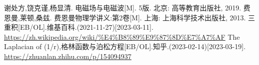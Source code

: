 \begin{thebibliography}{99}%
     谢处方,饶克谨,杨显清. 电磁场与电磁波[M]. 5版. 北京: 高等教育出版社, 2019.
     费恩曼,莱顿,桑兹. 费恩曼物理学讲义:第2卷[M]. 上海: 上海科学技术出版社, 2013.
     三重积[EB/OL].维基百科.(2021-11-27)[2023-03-11].\\\url{https://zh.wikipedia.org/wiki/%E4%B8%89%E9%87%8D%E7%A7%AF}
     The Laplacian of (1/r),格林函数与泊松方程[EB/OL].知乎.(2023-02-14)[2023-03-19].\\\url{https://zhuanlan.zhihu.com/p/154094937}
    
\end{thebibliography}
